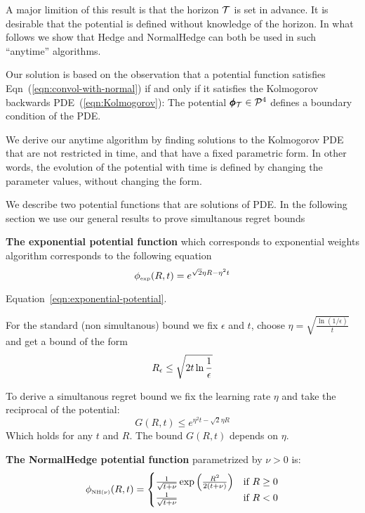 \documentclass{article}[12pt]
\begin{document}
A major limition of this result is that the horizon $\mathcal{T}$ is set in
advance.  It is desirable that the potential is defined without
knowledge of the horizon.  In what follows we show that Hedge and
NormalHedge can both be used in such ``anytime'' algorithms.

Our solution is based on the observation that a potential function satisfies Eqn~(\ref{eqn:convol-with-normal}) if and only if it satisfies 
the Kolmogorov backwards PDE~(\ref{eqn:Kolmogorov}):
The potential $\pmb{\phi}_{\mathcal{T}} \in {\cal P}^{4}$ defines a boundary condition of the PDE.

We derive our anytime algorithm by finding solutions to the Kolmogorov
PDE that are not restricted in time, and that have a fixed parametric
form.  In other words, the evolution of the potential with time is
defined by changing the parameter values, without changing the form.

We describe two potential functions that are solutions of PDE. In the following section we use our general results to prove simultanous regret bounds

{\bf The exponential potential function} which corresponds to exponential
  weights algorithm corresponds to the following equation
\begin{equation} \label{eqn:exponential-potential}
    \phi_{\mbox{\tiny exp}}(R,t) = e^{\sqrt{2} \eta R - \eta^2 t}
\end{equation}

Equation~\ref{eqn:exponential-potential}.

For the standard (non simultanous) bound we fix $\epsilon$ and $t$,
choose $\eta = \sqrt{\frac{\ln (1/\epsilon)}{t}}$
and get a bound of the form 
  \begin{equation}
    R_\epsilon \leq \sqrt{2 t \ln \frac{1}{\epsilon}}
  \end{equation}

  To derive a simultanous regret bound we fix the learning rate $\eta$ and take the reciprocal of the potential:
 \[
    G(R,t) \leq e^{\eta^2 t - \sqrt{2}\eta R}
 \]
Which holds for any $t$ and $R$. The bound $G(R,t)$ depends on $\eta$.

  
{\bf The NormalHedge potential function} parametrized by $\nu>0$ is:
\begin{equation} \label{eqn:NormalHedge}
  \phi_{\mbox{\tiny NH$(\nu)$}}(R,t) = \begin{cases}
    \frac{1}{\sqrt{t+\nu}}\exp\left(\frac{R^2}{2(t+\nu)}\right)
    & \mbox{if } R \geq 0  \\
  \frac{1}{\sqrt{t+\nu}} & \mbox{if } R <0
  \end{cases}
\end{equation}
\end{document}
